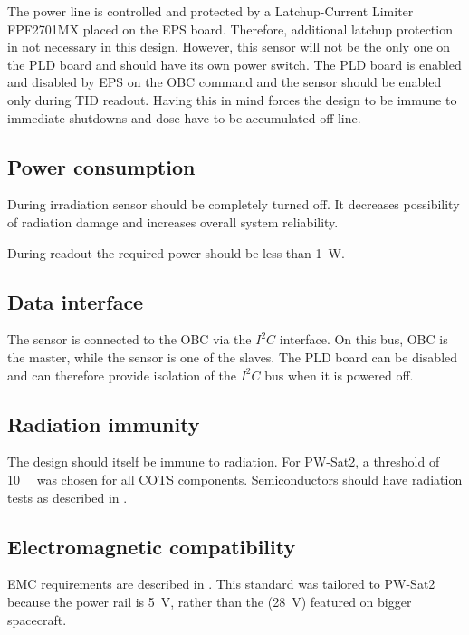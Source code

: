         The power line is controlled and protected by a Latchup-Current Limiter FPF2701MX placed on the EPS board. Therefore, additional latchup protection in not necessary in this design. However, this sensor will not be the only one on the PLD board and should have its own power switch. The PLD board is enabled and disabled by EPS on the OBC command and the sensor should be enabled only during TID readout. Having this in mind forces the design to be immune to immediate shutdowns and dose have to be accumulated off-line.

    \subsection{Power consumption}
        During irradiation sensor should be completely turned off. It decreases possibility of radiation damage and increases overall system reliability.

        During readout the required power should be less than \SI{1}{W}.

    \subsection{Data interface}
        The sensor is connected to the OBC via the $I^2C$ interface. On this bus, OBC is the master, while the sensor is one of the slaves. The PLD board can be disabled and can therefore provide isolation of the $I^2C$ bus when it is powered off.

    \subsection{Radiation immunity}
        The design should itself be immune to radiation. For PW-Sat2, a threshold of \SI{10}{\kilo\rad} was chosen for all COTS components. Semiconductors should have radiation tests as described in \cite{ESCIES_TID_test_method}.

    \subsection{Electromagnetic compatibility}
        EMC requirements are described in \cite{ECSS_E_ST_20_07C}. This standard was tailored to PW-Sat2 because the power rail is \SI{+5}{\volt}, rather than the (\SI{+28}{\volt}) featured on bigger spacecraft.

